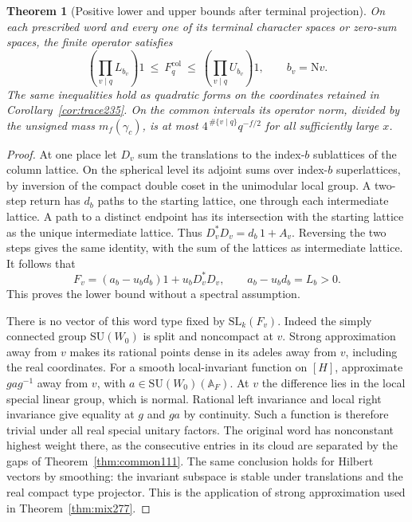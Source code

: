 \documentclass[a4paper,11pt]{article}
\newtheorem{theorem}[proposition]{Theorem}
\theoremstyle{definition}
\theoremstyle{remark}
\numberwithin{equation}{section}
\begin{document}
\begin{theorem}[Positive lower and upper bounds after terminal projection]\leavevmode
\label{thm:bounds282}
On each prescribed word and every one of its terminal
character spaces or zero-sum spaces, the finite operator satisfies
\[
       \left(\prod_{v\mid q} L_{b_v}\right)1
       \ \le\ F_q^{\mathrm{col}}\ \le\
       \left(\prod_{v\mid q} U_{b_v}\right)1,
       \qquad b_v=\mathrm Nv .
\]
The same inequalities hold as quadratic forms on the
coordinates retained in Corollary~\ref{cor:trace235}.
On the common intervals its operator norm, divided by the
unsigned mass \(m_f(\gamma_c)\), is at most
\(4^{\,\#\{v\mid q\}}q^{-f/2}\) for all sufficiently large
\(x\).
\end{theorem}
\begin{proof}
At one place let \(D_v\) sum the translations to the
index-\(b\) sublattices of the column lattice. On the
spherical level its adjoint sums over index-\(b\)
superlattices, by inversion of the compact double coset in
the unimodular local group. A two-step return has \(d_b\)
paths to the starting lattice, one through each intermediate
lattice. A path to a distinct endpoint has its intersection
with the starting lattice as the unique intermediate lattice.
Thus \(D_v^*D_v=d_b\,1+A_v\). Reversing the two steps gives
the same identity, with the sum of the lattices as intermediate
lattice. It follows that
\[
                 F_v=(a_b-u_b d_b)1+u_b D_v^*D_v,
                 \qquad a_b-u_b d_b=L_b>0 .
\]
This proves the lower bound without a spectral assumption.

There is no vector of this word type fixed by
\(\mathrm{SL}_k(F_v)\). Indeed the simply connected group
\(\mathrm{SU}(W_0)\) is split and noncompact at \(v\).
Strong approximation away from \(v\) makes its rational
points dense in its adeles away from \(v\), including the
real coordinates. For a smooth local-invariant function
on \([H]\), approximate \(gag^{-1}\) away from \(v\), with
\(a\in\mathrm{SU}(W_0)(\mathbb A_F)\). At \(v\) the
difference lies in the local special linear group, which
is normal. Rational left invariance and local right
invariance give equality at \(g\) and \(ga\) by continuity.
Such a function is therefore trivial under all real special
unitary factors. The original word has nonconstant highest
weight there, as the consecutive entries in its cloud are
separated by the gaps of Theorem~\ref{thm:common111}.
The same conclusion holds for Hilbert vectors by smoothing:
the invariant subspace is stable under translations and
the real compact type projector. This is the application of
strong approximation used in Theorem~\ref{thm:mix277}.


\end{proof}
\end{document}

